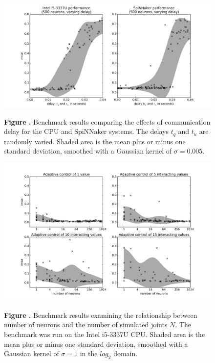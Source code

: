 \documentclass{frontiersSCNS} %
\begin{document}
\begin{figure}[h!]
\begin{center}
\includegraphics[width=18cm]{figures/plot_delay}
\end{center}
 \textbf{\label{fig:analysis_delay} Figure .}{ Benchmark results comparing the effects
     of communication delay for the CPU and SpiNNaker systems.  The delays $t_q$ and $t_u$ are randomly varied.  Shaded
 area is the mean plus or minus one standard deviation, smoothed with a Gaussian kernel of $\sigma=0.005$.}
\end{figure}

\begin{figure}[h!]
\begin{center}
\includegraphics[width=18cm]{figures/plot_vary_neurons}
\end{center}
 \textbf{\label{fig:analysis_neurons_cpu} Figure .}{ Benchmark results examining the relationship
     between number of neurons and the number of simulated joints $N$.  The
     benchmark was run on the Intel i5-3337U CPU.  Shaded
 area is the mean plus or minus one standard deviation, smoothed with a Gaussian kernel of $\sigma=1$ in the $log_2$ domain.}
\end{figure}
\end{document}
